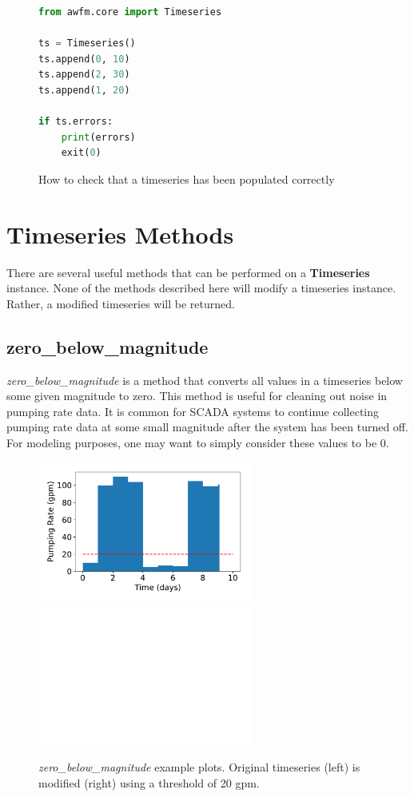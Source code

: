 \documentclass{book}
\begin{document}
\begin{figure}[H]
\begin{lstlisting}[language=python]
from awfm.core import Timeseries

ts = Timeseries()
ts.append(0, 10)
ts.append(2, 30)
ts.append(1, 20)

if ts.errors:
    print(errors)
    exit(0)
\end{lstlisting}
\caption{How to check that a timeseries has been populated correctly}
\end{figure}

\section{Timeseries Methods}

There are several useful methods that can be performed on a \textbf{Timeseries}
instance. None of the methods described here will modify a timeseries instance.
Rather, a modified timeseries will be returned. 

\subsection{zero\_below\_magnitude}

\emph{zero\_below\_magnitude} is a method that converts all values in a timeseries
below some given magnitude to zero. This method is useful for cleaning
out noise in pumping rate data. It is common for SCADA systems to continue
collecting pumping rate data at some small magnitude after the system
has been turned off. For modeling purposes, one may want to simply consider
these values to be 0. 

\begin{figure}[H]
\includegraphics[width=7cm]{python/timeseries_zero_below_magnitude_before.pdf}
\hspace{\fill}
\includegraphics[width=7cm]{python/timeseries_zero_below_magnitude_after.pdf}
\caption{ \emph{zero\_below\_magnitude} example plots. 
    Original timeseries (left) is modified (right) using a threshold of 20 gpm.}
\end{figure}
\end{document}
